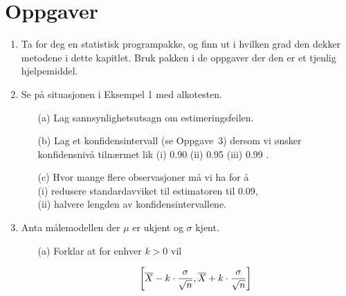 \section{Oppgaver}
\small
\begin{enumerate}
\item     Ta for deg en statistisk programpakke, og finn ut i
          hvilken grad den dekker metodene i dette kapitlet. Bruk
          pakken i de oppgaver der den er et tjenlig hjelpemiddel.
\item     Se på situasjonen i Eksempel 1 med alkotesten.
 \begin{itemize}
  \item[(a)]  Lag sannsynlighetsutsagn om estimeringsfeilen.
  \item[(b)]  Lag et konfidensintervall (se Oppgave~3) dersom
               vi ønsker konfidensnivå tilnærmet lik
               (i) 0.90  (ii) 0.95  (iii) 0.99 .
  \item[(c)]  Hvor mange flere observasjoner må vi ha for å  \\
               (i) redusere standardavviket til estimatoren til 0.09,\\
               (ii) halvere lengden av konfidensintervallene.
 \end{itemize}
\item     Anta målemodellen der $\mu$ er ukjent og $\sigma$
          kjent. 
 \begin{itemize}
  \item[(a)]  Forklar at for enhver $ k> 0$ vil

          \[\left\lbrack \bar X-k\cdot {\sigma\over \sqrt n},
          \bar X + k\cdot{\sigma\over \sqrt n}\right\rbrack\]
          

\end{itemize}
\end{enumerate}
